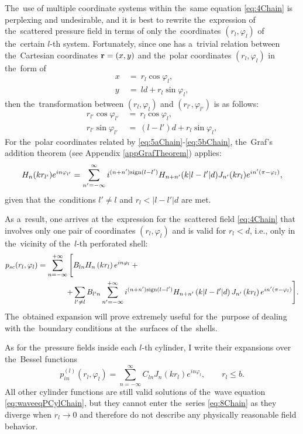 The~use of multiple coordinate systems within the~same equation \cref{eq:4Chain} is perplexing and undesirable, and it is best to rewrite the~expression of the~scattered pressure field in terms of only the~coordinates $(r_l, \varphi_l)$ of the~certain $l$-th system.
Fortunately, since one has a~trivial relation between the~Cartesian coordinates ${\bf r}=(x,y)$ and the~polar coordinates $(r_l,\varphi_l)$ in the~form of 
\begin{align}
x~&=~r_l \cos\varphi_l, \\
y~&=~ld + r_l \sin \varphi_l,
\end{align}
then the~transformation between $(r_l,\varphi_l)$ and $(r_{l'},\varphi_{l'})$ is as follows:
\begin{align}
r_{l'} \cos\varphi_{l'}~&=~r_l \cos\varphi_l, \label{eq:5aChain} \\
r_{l'} \sin\varphi_{l'}~&=~(l-l')d + r_l \sin \varphi_l, \label{eq:5bChain}
\end{align}
For the~polar coordinates related by \cref{eq:5aChain}-\cref{eq:5bChain}, the~Graf's addition theorem (see Appendix \ref{appGrafTheorem}) applies:
\begin{equation}
\label{eq:6Chain}
H_{n}(k r_{l'}) e^{in \varphi_{l'}} = \sum\limits_{n'=-\infty}^{\infty}i^{(n+n') \text{sign}(l-l')} H_{n+n'}(k |l-l'| d) J_{n'}(k r_l) e^{i n'(\pi- \varphi_l)},
\end{equation}
given that the~conditions $l' \neq l$ and $r_l<|l-l'|d$ are met.

As a~result, one arrives at the~expression for the~scattered field \cref{eq:4Chain} that involves only one pair of coordinates $(r_l, \varphi_l)$ and is valid for $r_l<d$, i.e., only in the~vicinity of the~$l$-th perforated shell:
\begin{align}
\label{eq:7Chain}
p_{sc}(r_l,\varphi_l) = \sum\limits_{n=-\infty}^{+\infty} \Bigg[&B_{ln} H_{n}\left(k r_l\right) e^{i n \varphi_l}+ \Bigg.\\
+\Bigg. &\sum\limits_{l' \neq l} B_{l'n}\sum\limits_{n'=-\infty}^{+\infty}i^{(n+n')\text{sign}(l-l')}H_{n+n'}\left(k |l-l'| d\right) J_{n'}\left(k r_l\right) e^{i n'(\pi - \varphi_l)} \Bigg]. \notag
\end{align}
The~obtained expansion will prove extremely useful for the~purpose of dealing with the~boundary conditions at the~surfaces of the~shells.

As for the~pressure fields inside each $l$-th cylinder, I write their expansions over the~Bessel functions
\begin{equation}
\label{eq:8Chain}
p_{in}^{(l)}(r_l,\varphi_l) = \sum_{n=-\infty}^{\infty} {C_{ln} J_n(k r_l)e^{in \varphi_l}}, \qquad r_l \le b.
\end{equation}
All other cylinder functions are still valid solutions of the~wave equation \cref{eq:waveeqPCylChain}, but they cannot enter the~series \cref{eq:8Chain} as they diverge when $r_l\rightarrow 0$ and therefore do not describe any physically reasonable field behavior.



